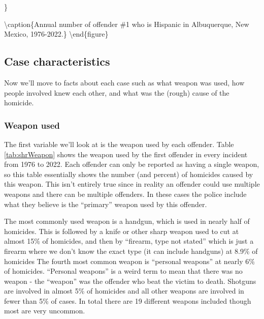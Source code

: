 \documentclass[
  12pt,
  openany]{book}
\begin{document}
\}

\textbackslash caption\{Annual number of offender \#1 who is Hispanic in Albuquerque, New Mexico, 1976-2022.\}\label{fig:ABQ}
\textbackslash end\{figure\}

\subsection{Case characteristics}\label{case-characteristics}

Now we'll move to facts about each case such as what weapon was used, how people involved knew each other, and what was the (rough) cause of the homicide.

\subsubsection{Weapon used}\label{weapon-used}

The first variable we'll look at is the weapon used by each offender. Table \ref{tab:shrWeapon} shows the weapon used by the first offender in every incident from 1976 to 2022. Each offender can only be reported as having a single weapon, so this table essentially shows the number (and percent) of homicides caused by this weapon. This isn't entirely true since in reality an offender could use multiple weapons and there can be multiple offenders. In these cases the police include what they believe is the ``primary'' weapon used by this offender.

The most commonly used weapon is a handgun, which is used in nearly half of homicides. This is followed by a knife or other sharp weapon used to cut at almost 15\% of homicides, and then by ``firearm, type not stated'' which is just a firearm where we don't know the exact type (it can include handguns) at 8.9\% of homicides The fourth most common weapon is ``personal weapons'' at nearly 6\% of homicides. ``Personal weapons'' is a weird term to mean that there was no weapon - the ``weapon'' was the offender who beat the victim to death. Shotguns are involved in almost 5\% of homicides and all other weapons are involved in fewer than 5\% of cases. In total there are 19 different weapons included though most are very uncommon.
\end{document}
